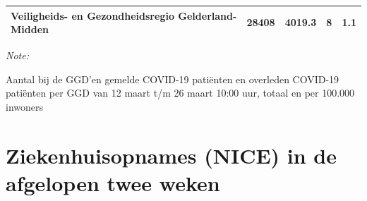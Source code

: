 \documentclass[
  english,
  man,floatsintext]{apa6}
\begin{document}
\begin{table}
\begin{threeparttable}
\begin{tabular}{lrrrr}
Veiligheids- en Gezondheidsregio Gelderland-Midden & 28408 & 4019.3 & 8 & 1.1\\
\bottomrule
\end{tabular}
\begin{tablenotes}
\item \textit{Note: } 
\item Aantal bij de GGD’en gemelde COVID-19 patiënten en overleden COVID-19 patiënten per GGD van 12 maart t/m 26 maart 10:00 uur, totaal en per 100.000 inwoners
\end{tablenotes}
\end{threeparttable}
\endgroup{}
\end{table}

\newpage

\hypertarget{ziekenhuisopnames-nice-in-de-afgelopen-twee-weken}{%
\section{Ziekenhuisopnames (NICE) in de afgelopen twee weken}\label{ziekenhuisopnames-nice-in-de-afgelopen-twee-weken}}
\end{document}
